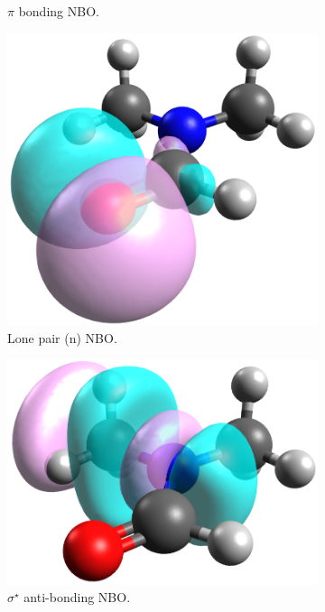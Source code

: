 \begin{refsection}
\begin{figure}
\begin{subfigure}{0.3\linewidth}
        \caption{$ \pi $ bonding NBO.}
    \end{subfigure}

    \begin{subfigure}{0.3\linewidth}
        \includegraphics[width=0.8\linewidth]{Figures/dmfnbo-n.png}
        \caption{Lone pair (n) NBO.}
    \end{subfigure}
    \begin{subfigure}{0.3\linewidth}
        \includegraphics[width=0.8\linewidth]{Figures/dmfnbo-sigmastar.png}
        \caption{$ \sigma^{\star} $ anti-bonding NBO.}
    \end{subfigure}
    \begin{subfigure}{0.3\linewidth}

\end{subfigure}
\end{figure}
\end{refsection}
